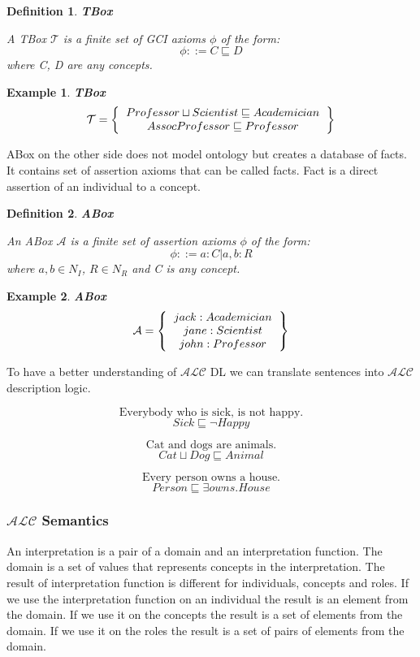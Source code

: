 \documentclass[12pt,a4paper]{article}
\newtheorem{definition}{Definition}[subsection]
\newtheorem{example}{Example}[subsection]
\begin{document}
\begin{definition}{\textbf{TBox}}
	
	A TBox $\mathcal{T}$ is a finite set of GCI axioms $\phi$ of the form:
	\[ \phi ::= C \sqsubseteq D \]	
	where C, D are any concepts.
\end{definition}

\begin{example}{\textbf{TBox}}
	\[ 
	\mathcal{T} = \left\{
	\begin{tabular}{c c}
	$Professor \sqcup Scientist \sqsubseteq Academician$ \\
	$AssocProfessor \sqsubseteq Professor$ \\
	\end{tabular}
	\right \}
	\]
\end{example}

ABox on the other side does not model ontology but creates a database of facts. It contains set of assertion axioms that can be called facts. Fact is a direct assertion of an individual to a concept.

\begin{definition}{\textbf{ABox}}
	
    An ABox $\mathcal{A}$ is a finite set of assertion axioms $\phi$ of the form:
	\[ \phi ::= a:C | a,b:R \]
	where $a,b \in N_{I}$, $R \in N_{R}$ and C is any concept.
\end{definition}

\begin{example}{\textbf{ABox}}
	\[ 
	\mathcal{A} = \left\{
	\begin{tabular}{c c}
	$jack : Academician$ \\
	$jane : Scientist$ \\
	$john : Professor$ \\
	\end{tabular}
	\right \}
	\]
\end{example}

To have a better understanding of $\mathcal{ALC}$ DL we can translate sentences into $\mathcal{ALC}$ description logic.

\[ \text{Everybody who is sick, is not happy.} \]
\[ Sick \sqsubseteq \neg Happy \]

\[ \text{Cat and dogs are animals.} \]
\[ Cat \sqcup Dog \sqsubseteq Animal \]

\[ \text{Every person owns a house.} \]
\[ Person \sqsubseteq \exists owns.House \]

\subsubsection{$\mathcal{ALC}$ Semantics}
An interpretation is a pair of a domain and an interpretation function. The domain is a set of values that represents concepts in the interpretation. The result of interpretation function is different for individuals, concepts and roles. If we use the interpretation function on an individual the result is an element from the domain. If we use it on the concepts the result is a set of elements from the domain. If we use it on the roles the result is a set of pairs of elements from the domain.
\end{document}
